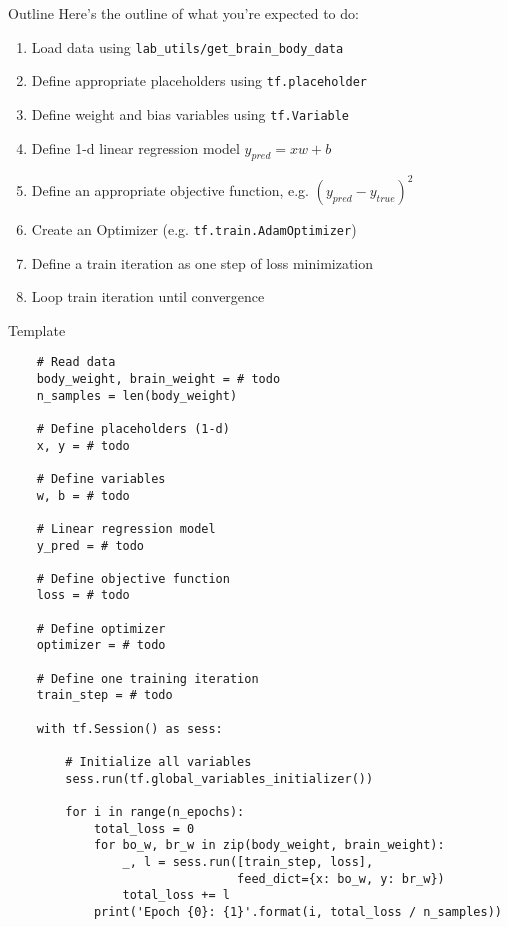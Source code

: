 \documentclass[aspectratio=169]{beamer}
\begin{document}
\begin{frame}{Outline}
Here's the outline of what you're expected to do:
\begin{enumerate}
\item Load data using \texttt{lab\_utils/get\_brain\_body\_data}
\item Define appropriate placeholders using \texttt{tf.placeholder}
\item Define weight and bias variables using \texttt{tf.Variable}
\item Define 1-d linear regression model $y_{pred} = x w + b$
\item Define an appropriate objective function, e.g. $(y_{pred} - y_{true})^2$
\item Create an Optimizer (e.g. \texttt{tf.train.AdamOptimizer})
\item Define a train iteration as one step of loss minimization
\item Loop train iteration until convergence
\end{enumerate}
\end{frame}


\begin{frame}{Template}
\begin{verbatim}
    # Read data
    body_weight, brain_weight = # todo
    n_samples = len(body_weight)

    # Define placeholders (1-d)
    x, y = # todo
	
    # Define variables
    w, b = # todo

    # Linear regression model
    y_pred = # todo

    # Define objective function
    loss = # todo

    # Define optimizer
    optimizer = # todo

    # Define one training iteration
    train_step = # todo
    
    with tf.Session() as sess:

        # Initialize all variables
        sess.run(tf.global_variables_initializer())

        for i in range(n_epochs):
            total_loss = 0
            for bo_w, br_w in zip(body_weight, brain_weight):
                _, l = sess.run([train_step, loss],
                                feed_dict={x: bo_w, y: br_w})
                total_loss += l
            print('Epoch {0}: {1}'.format(i, total_loss / n_samples))\end{verbatim}
\end{frame}
\end{document}

